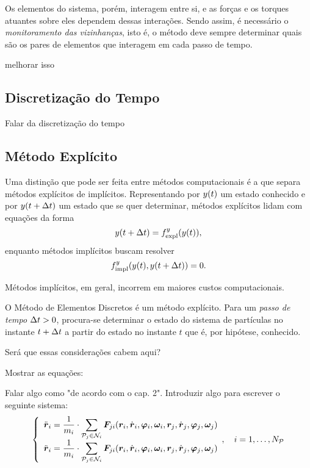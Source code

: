 Os elementos do sistema, porém, interagem entre si, e as forças e os torques atuantes sobre eles dependem dessas interações. Sendo assim, é necessário o \textit{monitoramento das vizinhanças}, isto é, o método deve sempre determinar quais são os pares de elementos que interagem em cada passo de tempo.

\alert{melhorar isso}

\subsection{Discretização do Tempo}

\alert{Falar da discretização do tempo}

\subsection{Método Explícito}

Uma distinção que pode ser feita entre métodos computacionais é a que separa métodos explícitos de implícitos. Representando por \(y\pqty{t}\) um estado conhecido e por \(y\pqty{t+\Dt}\) um estado que se quer determinar, métodos explícitos lidam com equações da forma
\begin{equation*}
	y\pqty{t+\Dt} = \eqForExplicit{y}\pqty{y\pqty{t}},
\end{equation*}
enquanto métodos implícitos buscam resolver
\begin{equation*}
	\eqForImplicit{y}\pqty{y\pqty{t}, y\pqty{t+\Dt}} = 0.
\end{equation*}

Métodos implícitos, em geral, incorrem em maiores custos computacionais. 

O Método de Elementos Discretos é um método explícito. Para um \textit{passo de tempo} \(\Delta t>0\), procura-se determinar o estado do sistema de partículas no instante \(t+\Delta t\) a partir do estado no instante \(t\) que é, por hipótese, conhecido.

\alert{Será que essas considerações cabem aqui?}

\alert{Mostrar as equações:}

\alert{Falar algo como "de acordo com o cap. 2".}
\alert{Introduzir algo para escrever o seguinte sistema:}
\begin{equation*}
	\left\lbrace
		\begin{array}{l}
			\accelerationi = \inverted{\massi}\cdot\dsum_{\particlej\in\neighborhoodi} \forceji\pqty{\positioni, \velocityi, \orientationi, \angularVelocityi, \positionj, \velocityj, \orientationj, \angularVelocityj}
			\\
			\accelerationi = \inverted{\massi}\cdot\dsum_{\particlej\in\neighborhoodi} \forceji\pqty{\positioni, \velocityi, \orientationi, \angularVelocityi, \positionj, \velocityj, \orientationj, \angularVelocityj}
		\end{array},\quad i = 1, \dots, \numberOfParticles
	\right.
\end{equation*}

